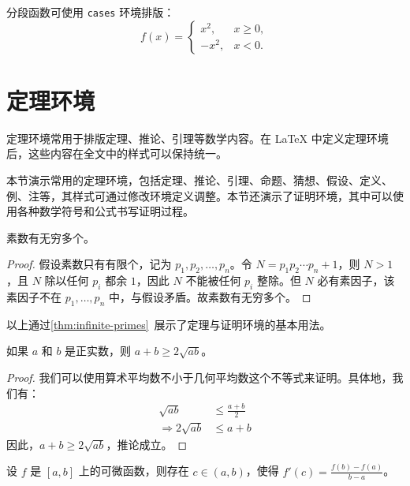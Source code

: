 分段函数可使用 \texttt{cases} 环境排版：
\begin{equation}\label{eq:piecewise}
  f(x) = \begin{cases}
    x^2,   & x \geq 0, \\
    -x^2,  & x < 0.
  \end{cases}
\end{equation}

\section{定理环境}

定理环境常用于排版定理、推论、引理等数学内容。在 \LaTeX{} 中定义定理环境后，这些内容在全文中的样式可以保持统一。

本节演示常用的定理环境，包括定理、推论、引理、命题、猜想、假设、定义、例、注等，其样式可通过修改环境定义调整。本节还演示了证明环境，其中可以使用各种数学符号和公式书写证明过程。

\begin{thm}\label{thm:infinite-primes}
  素数有无穷多个。
\end{thm}

\begin{proof}
  假设素数只有有限个，记为 $p_1, p_2, \dots, p_n$。令 $N = p_1 p_2 \cdots p_n + 1$，则 $N > 1$，且 $N$ 除以任何 $p_i$ 都余 $1$，因此 $N$ 不能被任何 $p_i$ 整除。但 $N$ 必有素因子，该素因子不在 $p_1, \dots, p_n$ 中，与假设矛盾。故素数有无穷多个。
\end{proof}

以上通过\cref{thm:infinite-primes}~展示了定理与证明环境的基本用法。

\begin{cor}
  如果 $a$ 和 $b$ 是正实数，则 $a+b \geq 2\sqrt{ab}$。
\end{cor}

\begin{proof}
  我们可以使用算术平均数不小于几何平均数这个不等式来证明。具体地，我们有：
  \begin{align*}
    \sqrt{ab}              & \leq \frac{a+b}{2} \\
    \Rightarrow 2\sqrt{ab} & \leq a+b
  \end{align*}
  因此，$a+b \geq 2\sqrt{ab}$，推论成立。
\end{proof}

\begin{lem}
  设 $f$ 是 $[a,b]$ 上的可微函数，则存在 $c \in (a,b)$，使得 $f'(c) = \frac{f(b)-f(a)}{b-a}$。
\end{lem}

